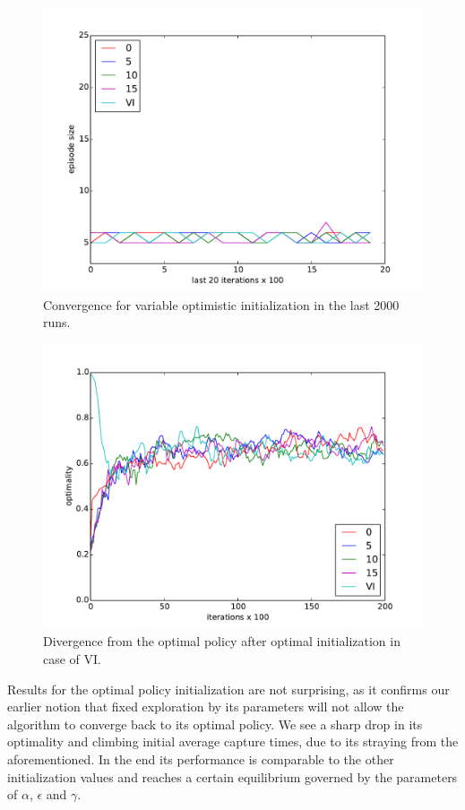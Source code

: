 \documentclass[paper=a4, fontsize=11pt]{scrartcl}
\numberwithin{equation}{section}		%
\numberwithin{figure}{section}			%
\numberwithin{table}{section}				%
\begin{document}
\begin{figure}[H] \centering
\includegraphics[scale=0.5]{optiInitlast20x100.pdf}
\caption{Convergence for variable optimistic initialization in the last 2000 runs.} 
\label{figure:optimisticlast20}
\end{figure}
\begin{figure}[H] \centering
\includegraphics[scale=0.6]{optimalityOptimistic.pdf}
\caption{Divergence from the optimal policy after optimal initialization in case of VI.} 
\label{figure:optiOpti}
\end{figure}
Results for the optimal policy initialization are not surprising, as it confirms our earlier notion that fixed exploration by its parameters will not allow the algorithm to converge back to its optimal policy. We see a sharp drop in its optimality and climbing initial average capture times, due to its straying from the aforementioned. In the end its performance is comparable to the other initialization values and reaches a certain equilibrium governed by the parameters of $\alpha$, $\epsilon$ and $\gamma$. 
\end{document}
